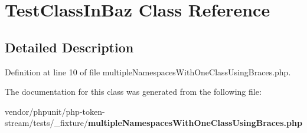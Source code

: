 \section{Test\+Class\+In\+Baz Class Reference}
\label{class_foo_1_1_baz_1_1_test_class_in_baz}


\subsection{Detailed Description}


Definition at line 10 of file multiple\+Namespaces\+With\+One\+Class\+Using\+Braces.\+php.



The documentation for this class was generated from the following file\+:\begin{DoxyCompactItemize}
\item 
vendor/phpunit/php-\/token-\/stream/tests/\+\_\+fixture/{\bf multiple\+Namespaces\+With\+One\+Class\+Using\+Braces.\+php}\end{DoxyCompactItemize}
